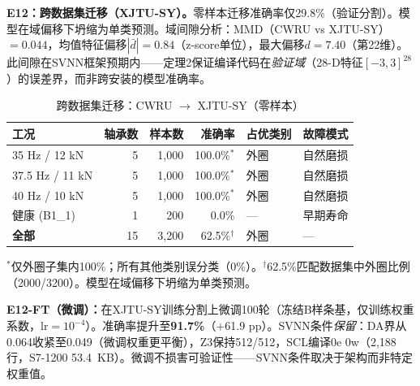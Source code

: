 \documentclass[journal,onecolumn]{IEEEtran}
\theoremstyle{definition}
\theoremstyle{plain}
\theoremstyle{remark}
\begin{document}
\noindent\textbf{E12：跨数据集迁移（XJTU-SY）。}零样本迁移准确率仅29.8\%（验证分割）。模型在域偏移下坍缩为单类预测。域间隙分析：MMD（CWRU vs XJTU-SY）$=0.044$，均值特征偏移$|\bar{d}| = 0.84$（z-score单位），最大偏移$d = 7.40$（第22维）。此间隙在SVNN框架预期内——定理2保证编译代码在\textit{验证域}（28-D特征$[-3,3]^{28}$）的误差界，而非跨安装的模型准确率。

\begin{table}[!t]
\centering
\caption{跨数据集迁移：CWRU $\to$ XJTU-SY（零样本）}
\label{tab:xjtu_sy}
\footnotesize
\begin{tabular}{@{}p{2.2cm}rrrp{1.5cm}p{1.7cm}@{}}
\toprule
\textbf{工况} & \textbf{轴承数} & \textbf{样本数} & \textbf{准确率} & \textbf{占优类别} & \textbf{故障模式} \\
\midrule
35 Hz / 12 kN    & 5 & 1,000 & 100.0\%$^{*}$ & 外圈 & 自然磨损 \\
37.5 Hz / 11 kN  & 5 & 1,000 & 100.0\%$^{*}$ & 外圈 & 自然磨损 \\
40 Hz / 10 kN    & 5 & 1,000 & 100.0\%$^{*}$ & 外圈 & 自然磨损 \\
健康 (B1\_1)     & 1 & 200   & 0.0\% & --- & 早期寿命 \\
\midrule
\textbf{全部}     & 15 & 3,200 & 62.5\%$^{\dag}$ & 外圈 & --- \\
\bottomrule
\end{tabular}
\vspace{1pt}
{\scriptsize $^{*}$仅外圈子集内100\%；所有其他类别误分类（0\%）。$^{\dag}$62.5\%匹配数据集中外圈比例（2000/3200）。模型在域偏移下坍缩为单类预测。}
\end{table}

\textbf{E12-FT（微调）：}在XJTU-SY训练分割上微调100轮（冻结B样条基，仅训练权重系数，lr$=10^{-4}$）。准确率提升至\textbf{91.7\%}（$+$61.9 pp）。SVNN条件\textit{保留}：DA界从0.064收紧至0.049（微调权重更平衡），Z3保持512/512，SCL编译0e 0w（2,188行，S7-1200 53.4~KB）。微调不损害可验证性——SVNN条件取决于架构而非特定权重值。
\end{document}

